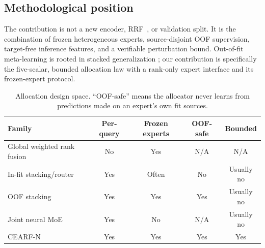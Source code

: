 \documentclass[runningheads]{llncs}
\newcommand{\method}{CEARF-N}
\begin{document}
\subsection{Methodological position}
The contribution is not a new encoder, RRF~\cite{cormack2009rrf}, or validation split. It is the
combination of frozen heterogeneous experts, source-disjoint OOF supervision,
target-free inference features, and a verifiable perturbation bound.
Out-of-fit meta-learning is rooted in stacked generalization
\cite{wolpert1992stacking}; our contribution is specifically the five-scalar,
bounded allocation law with a rank-only expert interface and its
frozen-expert protocol.
\begin{table}[h]
\caption{Allocation design space. ``OOF-safe'' means the allocator never
learns from predictions made on an expert's own fit sources.}
\centering\small
\begin{tabular}{lcccc}
\toprule
Family & Per-query & Frozen experts & OOF-safe & Bounded\\
\midrule
Global weighted rank fusion & No & Yes & N/A & N/A\\
In-fit stacking/router & Yes & Often & No & Usually no\\
OOF stacking & Yes & Yes & Yes & Usually no\\
Joint neural MoE & Yes & No & N/A & Usually no\\
\method{} & Yes & Yes & Yes & Yes\\
\bottomrule
\end{tabular}
\end{table}
\end{document}
